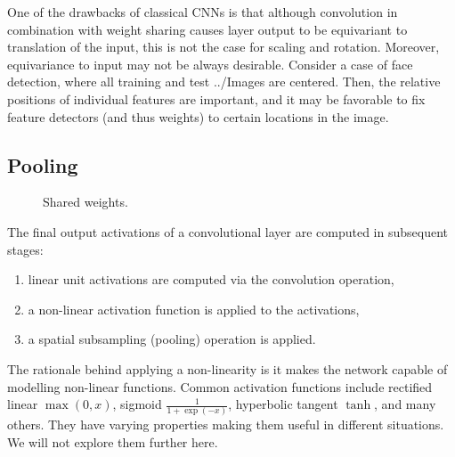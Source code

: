\documentclass[11pt,czech,american,dvipsnames]{book}
\begin{document}
One of the drawbacks of classical CNNs is that although convolution in combination with weight sharing causes layer output to be equivariant to translation of the input, this is not the case for scaling and rotation. Moreover, equivariance to input may not be always desirable. Consider a case of face detection, where all training and test ../Images are centered. Then, the relative positions of individual features are important, and it may be favorable to fix feature detectors (and thus weights) to certain locations in the image.

\subsection{Pooling}
\begin{figure} 

\centering
\noindent{}
  \caption{Shared weights. \cite{goodfellow2016}}
\label{fig:shared_weights}
\end{figure}

The final output activations of a convolutional layer are computed in subsequent stages:
\begin{enumerate}
  \item linear unit activations are computed via the convolution operation,
  \item a non-linear activation function is applied to the activations,
  \item a spatial subsampling (pooling) operation is applied.
\end{enumerate}

The rationale behind applying a non-linearity is it makes the network capable of modelling non-linear functions. Common activation functions include rectified linear $\max(0,x)$, sigmoid $\frac{1}{1+\exp(-x)}$, hyperbolic tangent $\tanh$, and many others. They have varying properties making them useful in different situations. We will not explore them further here.
\end{document}

